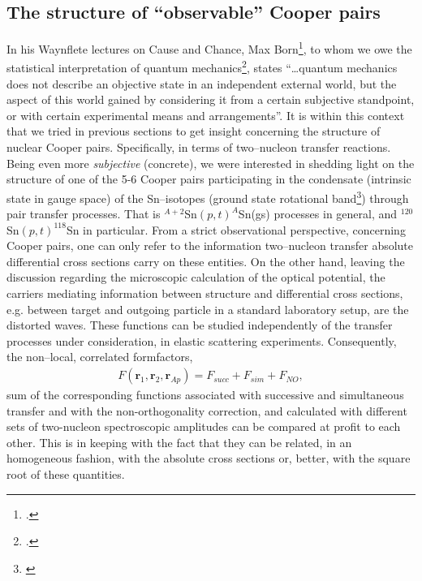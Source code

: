\subsection{The structure of ``observable'' Cooper pairs}\label{S6.5.4}
In his Waynflete lectures on Cause and Chance, Max Born\footnote{\cite{Born:48}.}, to whom we owe the statistical interpretation of quantum mechanics\footnote{\cite{Born:64,Pais:86}.}, states ``\dots quantum mechanics does not describe an objective state in an independent external world, but the aspect of this world gained by considering it from a certain subjective standpoint, or with certain experimental means and arrangements''. It is within this context that we tried in previous sections to get insight concerning the structure of nuclear Cooper pairs. Specifically, in terms of two--nucleon transfer reactions. Being even more \textit{subjective} (concrete), we were interested in shedding light on the structure of one of the 5-6 Cooper pairs participating in the condensate (intrinsic state in gauge space) of the Sn--isotopes (ground state rotational band\footnote{\cite{Potel:13b,Potel:17}}) through pair transfer processes. That is $^{A+2}$Sn$(p,t)^{A}$Sn(gs) processes in general, and $^{120}$Sn$(p,t)^{118}$Sn in particular. From a strict observational perspective, concerning Cooper pairs, one can only refer to the information two--nucleon transfer absolute differential cross sections carry on these entities. On the other hand, leaving the discussion regarding the microscopic calculation of the optical potential, the carriers mediating information between structure and differential cross sections, e.g. between target and outgoing particle in a standard laboratory setup, are the distorted waves. These functions can be studied independently of the transfer processes under consideration, in elastic scattering experiments. Consequently, the non--local, correlated formfactors,
\begin{align}\label{eq6.6.1}
F(\mathbf r_1,\mathbf r_2,\mathbf r_{Ap})=F_{succ}+F_{sim}+F_{NO},
\end{align}
sum of the corresponding functions associated with successive and simultaneous transfer  and with the non-orthogonality correction, and calculated with different sets of two-nucleon spectroscopic amplitudes can be compared at profit to each other. This is in keeping with the fact that they can be related, in an homogeneous fashion, with the absolute cross sections or, better, with the square root of these quantities. 

